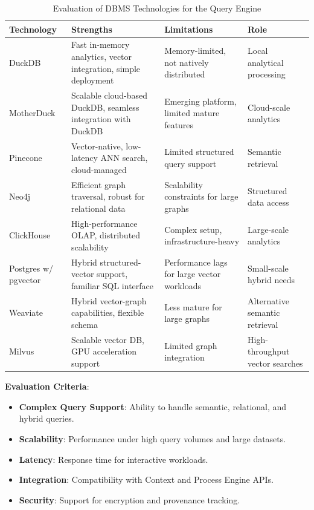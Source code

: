 \documentclass[11pt]{article}
\begin{document}
\begin{table}[ht]
\centering
\caption{Evaluation of DBMS Technologies for the Query Engine}
\label{tab:dbms_evaluation}
\begin{tabular}{|l|p{4cm}|p{4cm}|p{3cm}|}
    \hline
    \textbf{Technology} & \textbf{Strengths} & \textbf{Limitations} & \textbf{Role} \\
    \hline
    DuckDB & Fast in-memory analytics, vector integration, simple deployment & Memory-limited, not natively distributed & Local analytical processing \\
    MotherDuck & Scalable cloud-based DuckDB, seamless integration with DuckDB & Emerging platform, limited mature features & Cloud-scale analytics \\
    Pinecone & Vector-native, low-latency ANN search, cloud-managed & Limited structured query support & Semantic retrieval \\
    Neo4j & Efficient graph traversal, robust for relational data & Scalability constraints for large graphs & Structured data access \\
    ClickHouse & High-performance OLAP, distributed scalability & Complex setup, infrastructure-heavy & Large-scale analytics \\
    Postgres w/ pgvector & Hybrid structured-vector support, familiar SQL interface & Performance lags for large vector workloads & Small-scale hybrid needs \\
    Weaviate & Hybrid vector-graph capabilities, flexible schema & Less mature for large graphs & Alternative semantic retrieval \\
    Milvus & Scalable vector DB, GPU acceleration support & Limited graph integration & High-throughput vector searches \\
    \hline
\end{tabular}
\end{table}

\textbf{Evaluation Criteria}:
\begin{itemize}
    \item \textbf{Complex Query Support}: Ability to handle semantic, relational, and hybrid queries.
    \item \textbf{Scalability}: Performance under high query volumes and large datasets.
    \item \textbf{Latency}: Response time for interactive workloads.
    \item \textbf{Integration}: Compatibility with Context and Process Engine APIs.
    \item \textbf{Security}: Support for encryption and provenance tracking.
\end{itemize}
\end{document}
